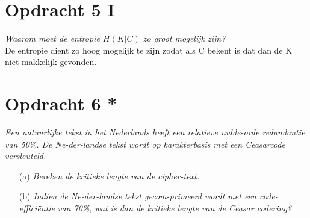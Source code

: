 \section{Opdracht 5 I}
\emph{Waarom moet de entropie $H(K|C)$ zo groot mogelijk zijn?}\\
De entropie dient zo hoog mogelijk te zijn zodat als C bekent is dat dan de K niet makkelijk gevonden.

\section{Opdracht 6 *}
\emph{Een natuurlijke tekst in het Nederlands heeft een relatieve nulde-orde redundantie van 50\%. De Ne-der-landse tekst wordt op karakterbasis met een Ceasarcode versleuteld.}\\
\begin{itemize}
  \item[(a)] \emph{Bereken de kritieke lengte van de cipher-text.}\\

  \item[(b)] \emph{Indien de Ne-der-landse tekst gecom-primeerd wordt met een code-effici\"{e}ntie van 70\%, wat is dan de kritieke lengte van de Ceasar codering?}\\
\end{itemize}
